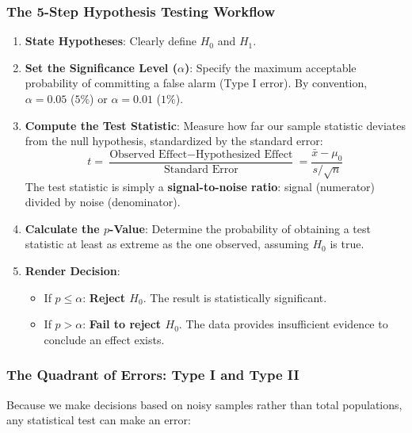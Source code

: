 \subsubsection{The 5-Step Hypothesis Testing Workflow}
\begin{enumerate}
    \item \textbf{State Hypotheses}: Clearly define $H_0$ and $H_1$.
    \item \textbf{Set the Significance Level ($\alpha$)}: Specify the maximum acceptable probability of committing a false alarm (Type I error). By convention, $\alpha = 0.05$ ($5\%$) or $\alpha = 0.01$ ($1\%$).
    \item \textbf{Compute the Test Statistic}: Measure how far our sample statistic deviates from the null hypothesis, standardized by the standard error:
    \begin{equation}
    t = \frac{\text{Observed Effect} - \text{Hypothesized Effect}}{\text{Standard Error}} = \frac{\bar{x} - \mu_0}{s / \sqrt{n}}\label{eq:t_statistic_signal_noise}
    \end{equation}
    The test statistic is simply a \textbf{signal-to-noise ratio}: signal (numerator) divided by noise (denominator).
    \item \textbf{Calculate the $p$-Value}: Determine the probability of obtaining a test statistic at least as extreme as the one observed, assuming $H_0$ is true.
    \item \textbf{Render Decision}:
    \begin{itemize}
        \item If $p \le \alpha$: \textbf{Reject $H_0$}. The result is statistically significant.
        \item If $p > \alpha$: \textbf{Fail to reject $H_0$}. The data provides insufficient evidence to conclude an effect exists.
    \end{itemize}
\end{enumerate}

\subsubsection{The Quadrant of Errors: Type I and Type II}
Because we make decisions based on noisy samples rather than total populations, any statistical test can make an error:

